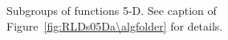 \documentclass{article}
\newcommand{\Df}{\ensuremath{\Delta f}}
\newcommand{\fopt}{\ensuremath{f_\mathrm{opt}}}
\begin{document}
\begin{figure}[htbp!]
\begin{tabular}{@{}c@{}c@{}}
\end{tabular}
\vspace*{-0.5ex}
\caption{\label{fig:RLDs05Db\algfolder}Subgroups of functions 5-D. See caption of Figure~\ref{fig:RLDs05Da\algfolder} for details.
}
\end{figure}
\end{document}
